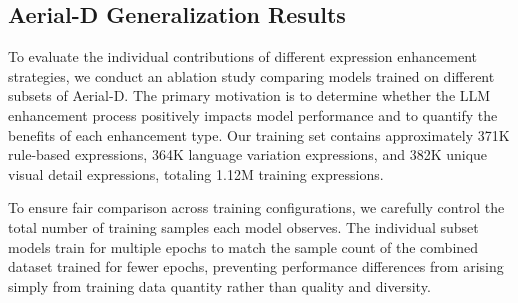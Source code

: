 \subsection{Aerial-D Generalization Results}
\label{subsec:ablation_studies}

To evaluate the individual contributions of different expression enhancement strategies, we conduct an ablation study comparing models trained on different subsets of Aerial-D. The primary motivation is to determine whether the LLM enhancement process positively impacts model performance and to quantify the benefits of each enhancement type. Our training set contains approximately 371K rule-based expressions, 364K language variation expressions, and 382K unique visual detail expressions, totaling 1.12M training expressions.

To ensure fair comparison across training configurations, we carefully control the total number of training samples each model observes. The individual subset models train for multiple epochs to match the sample count of the combined dataset trained for fewer epochs, preventing performance differences from arising simply from training data quantity rather than quality and diversity.

